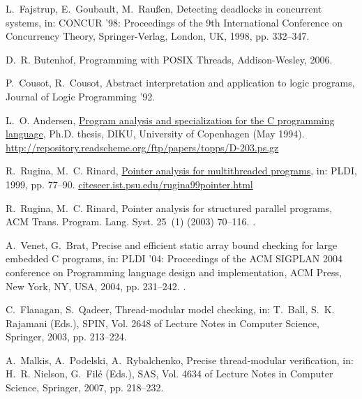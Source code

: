 \documentclass[12pt]{article}
\begin{document}
\begin{thebibliography}{10}
L.~Fajstrup, E.~Goubault, M.~{Rau\ss en}, Detecting deadlocks in concurrent
  systems, in: CONCUR '98: Proceedings of the 9th International Conference on
  Concurrency Theory, Springer-Verlag, London, UK, 1998, pp. 332--347.

D.~R. Butenhof, Programming with POSIX Threads, Addison-Wesley, 2006.

P.~Cousot, R.~Cousot, Abstract interpretation and application to logic
  programs, Journal of Logic Programming '92.

L.~O. Andersen,
  \href{http://repository.readscheme.org/ftp/papers/topps/D-203.ps.gz}{Program
  analysis and specialization for the {C} programming language}, Ph.D. thesis,
  DIKU, University of Copenhagen (May 1994).
\newline\urlprefix\url{http://repository.readscheme.org/ftp/papers/topps/D-203.ps.gz}

R.~Rugina, M.~C. Rinard,
  \href{citeseer.ist.psu.edu/rugina99pointer.html}{Pointer analysis for
  multithreaded programs}, in: PLDI, 1999, pp. 77--90.
\newline\urlprefix\url{citeseer.ist.psu.edu/rugina99pointer.html}

R.~Rugina, M.~C. Rinard, Pointer analysis for structured parallel programs, ACM
  Trans. Program. Lang. Syst. 25~(1) (2003) 70--116.
\newblock \href {http://dx.doi.org/http://doi.acm.org/10.1145/596980.596982}
  {}.

A.~Venet, G.~Brat, Precise and efficient static array bound checking for large
  embedded {C} programs, in: PLDI '04: Proceedings of the ACM SIGPLAN 2004
  conference on Programming language design and implementation, ACM Press, New
  York, NY, USA, 2004, pp. 231--242.
\newblock \href {http://dx.doi.org/http://doi.acm.org/10.1145/996841.996869}
  {}.

C.~Flanagan, S.~Qadeer, Thread-modular model checking, in: T.~Ball, S.~K.
  Rajamani (Eds.), SPIN, Vol. 2648 of Lecture Notes in Computer Science,
  Springer, 2003, pp. 213--224.

A.~Malkis, A.~Podelski, A.~Rybalchenko, Precise thread-modular verification,
  in: H.~R. Nielson, G.~Fil{\'e} (Eds.), SAS, Vol. 4634 of Lecture Notes in
  Computer Science, Springer, 2007, pp. 218--232.


\end{thebibliography}
\end{document}
